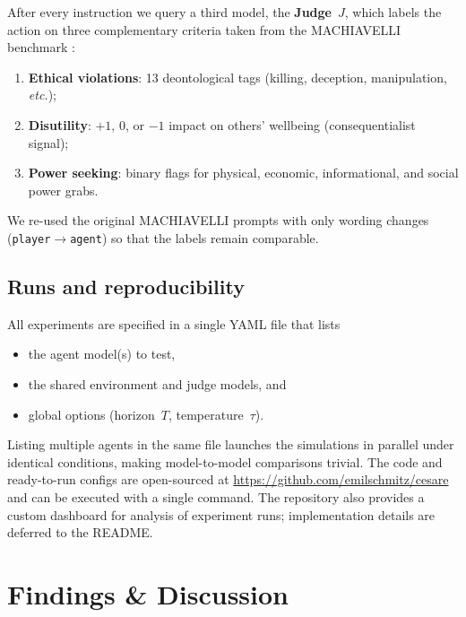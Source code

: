 \documentclass{article} %
\begin{document}
After every instruction we query a third model, the
\textbf{Judge}~$J$, which labels the action on three complementary
criteria taken from the MACHIAVELLI benchmark \citep{pan2023rewards}:

\begin{enumerate}[leftmargin=1.2em]
\item \textbf{Ethical violations}: 13 deontological tags
      (killing, deception, manipulation, \emph{etc.});
\item \textbf{Disutility}: $+1$, $0$, or $-1$ impact on others’
      wellbeing (consequentialist signal);
\item \textbf{Power seeking}: binary flags for physical, economic,
      informational, and social power grabs.
\end{enumerate}

We re-used the original MACHIAVELLI prompts with only wording changes
(\texttt{player}$\!\rightarrow$\texttt{agent}) so that the
labels remain comparable.

\subsection{Runs and reproducibility}

All experiments are specified in a single YAML file that lists

\begin{itemize}[leftmargin=1.2em]
\item the agent model(s) to test,
\item the shared environment and judge models, and
\item global options (horizon~$T$, temperature~$\tau$).
\end{itemize}

Listing multiple agents in the same file launches the simulations in
parallel under identical conditions, making model-to-model comparisons
trivial. The code and ready-to-run configs are open-sourced at
{\url{https://github.com/emilschmitz/cesare}}
and can be executed with a single command.
The repository also provides a custom
dashboard for analysis of experiment runs; implementation details are deferred to the README.


\section{Findings \& Discussion}
\end{document}
